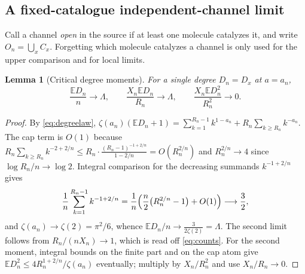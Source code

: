 \documentclass[11pt,letterpaper]{article}
\theoremstyle{plain}
\newtheorem{lemma}[theorem]{Lemma}
\theoremstyle{definition}
\theoremstyle{remark}
\numberwithin{equation}{section}
\newcommand{\EE}{\mathbb E}
\begin{document}
\subsection{A fixed-catalogue independent-channel limit}
Call a channel \emph{open} in the source if at least one molecule catalyzes it, and write $O_n=\bigcup_xC_x$. Forgetting which molecule catalyzes a channel is only used for the upper comparison and for local limits.

\begin{lemma}[Critical degree moments]\label{lem:moments}
For a single degree $D_n=D_x$ at $a=a_n$,
\begin{equation}\label{eq:moments}
 \frac{\EE D_n}{n}\longrightarrow\Lambda,\qquad \frac{X_n\EE D_n}{R_n}\longrightarrow\Lambda,\qquad \frac{X_n\EE D_n^2}{R_n^2}\longrightarrow0 .
\end{equation}
\end{lemma}
\begin{proof}
By \eqref{eq:degreelaw}, $\zeta(a_n)(\EE D_n+1)=\sum_{k=1}^{R_n-1}k^{1-a_n}+R_n\sum_{k\ge R_n}k^{-a_n}$. The cap term is $O(1)$ because $R_n\sum_{k\ge R_n}k^{-2+2/n}\le R_n\cdot\frac{(R_n-1)^{-1+2/n}}{1-2/n}=O(R_n^{2/n})$ and $R_n^{2/n}\to4$ since $\log R_n/n\to\log2$. Integral comparison for the decreasing summands $k^{-1+2/n}$ gives
\[
 \frac1n\sum_{k=1}^{R_n-1}k^{-1+2/n}=\frac1n\Bigl(\frac n2\bigl(R_n^{2/n}-1\bigr)+O(1)\Bigr)\longrightarrow\frac32 ,
\]
and $\zeta(a_n)\to\zeta(2)=\pi^2/6$, whence $\EE D_n/n\to\frac{3}{2\zeta(2)}=\Lambda$. The second limit follows from $R_n/(nX_n)\to1$, which is read off \eqref{eq:counts}. For the second moment, integral bounds on the finite part and on the cap atom give $\EE D_n^2\le4R_n^{1+2/n}/\zeta(a_n)$ eventually; multiply by $X_n/R_n^2$ and use $X_n/R_n\to0$.
\end{proof}
\end{document}
